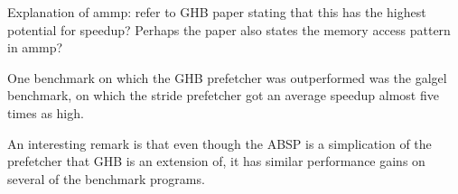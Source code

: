 
 Explanation of ammp: refer to GHB paper stating that this has the
 highest potential for speedup? Perhaps the paper also states the
 memory access pattern in ammp?

One benchmark on which the GHB prefetcher was outperformed was the
galgel benchmark, on which the stride prefetcher got an average
speedup almost five times as high.

An interesting remark is that even though the ABSP is a simplication
of the prefetcher that GHB is an extension of, it has similar
performance gains on several of the benchmark programs.




